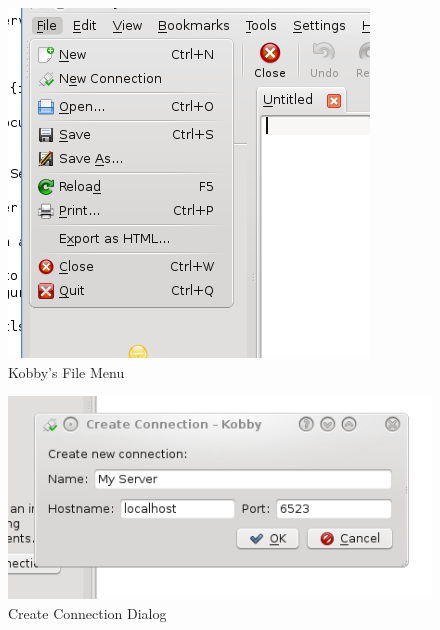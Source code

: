 \documentclass[11pt]{article}
\begin{document}
\begin{figure}[tbh]
\begin{center}
 \includegraphics[width=.4\textwidth]{kobbyfilemenu.png}
\end{center}
\caption{Kobby's File Menu}
\end{figure}

\begin{figure}[tbh]
\begin{center}
 \includegraphics[width=.6\textwidth]{kobbyconnection.png}
\end{center}
\caption{Create Connection Dialog}
\end{figure}
\end{document}
